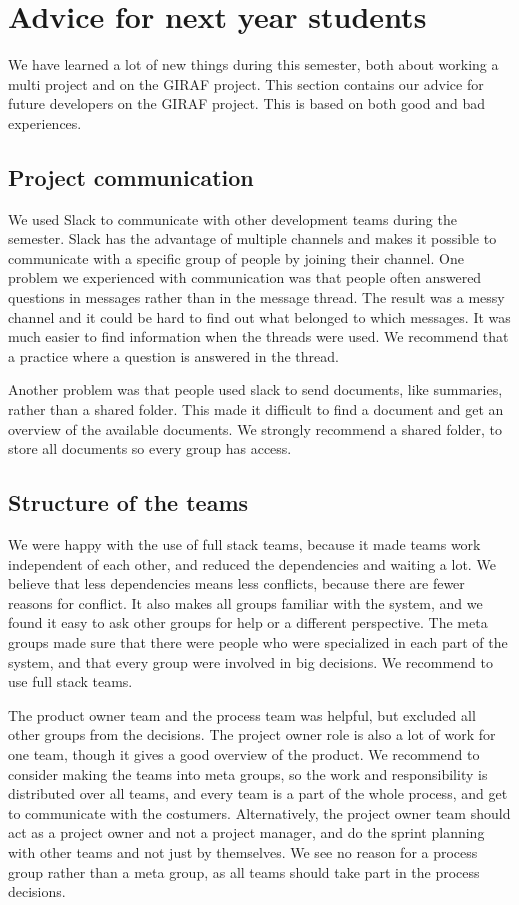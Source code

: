 \section{Advice for next year students}

We have learned a lot of new things during this semester, both about working a multi project and on the GIRAF project. This section contains our advice for future developers on the GIRAF project. This is based on both good and bad experiences. 

\subsection{Project communication}
We used Slack to communicate with other development teams during the semester. Slack has the advantage of multiple channels and makes it possible to communicate with a specific group of people by joining their channel. One problem we experienced with communication was that people often answered questions in messages rather than in the message thread. The result was a messy channel and it could be hard to find out what belonged to which messages. It was much easier to find information when the threads were used. We recommend that a practice where a question is answered in the thread. 

Another problem was that people used slack to send documents, like summaries, rather than a shared folder. This made it difficult to find a document and get an overview of the available documents. We strongly recommend a shared folder, to store all documents so every group has access. 

\subsection{Structure of the teams}
We were happy with the use of full stack teams, because it made teams work independent of each other, and reduced the dependencies and waiting a lot. We believe that less dependencies means less conflicts, because there are fewer reasons for conflict. It also makes all groups familiar with the system, and we found it easy to ask other groups for help or a different perspective. The meta groups made sure that there were people who were specialized in each part of the system, and that every group were involved in big decisions. We recommend to use full stack teams. 

The product owner team and the process team was helpful, but excluded all other groups from the decisions. The project owner role is also a lot of work for one team, though it gives a good overview of the product. We recommend to consider making the teams into meta groups, so the work and responsibility is distributed over all teams, and every team is a part of the whole process, and get to communicate with the costumers. Alternatively, the project owner team should act as a project owner and not a project manager, and do the sprint planning with other teams and not just by themselves. We see no reason for a process group rather than a meta group, as all teams should take part in the process decisions. 

